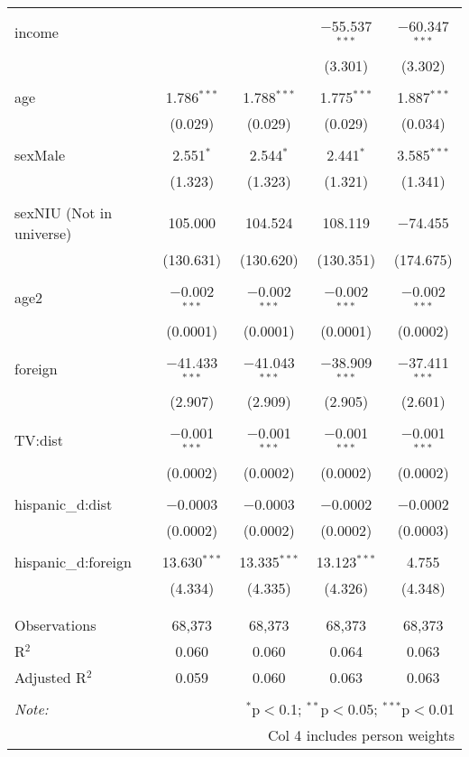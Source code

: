 \begin{table}[!htbp]
\begin{tabular}{@{\extracolsep{-5pt}}lcccc}
  & & & & \\ 
 income &  &  & $-$55.537$^{***}$ & $-$60.347$^{***}$ \\ 
  &  &  & (3.301) & (3.302) \\ 
  & & & & \\ 
 age & 1.786$^{***}$ & 1.788$^{***}$ & 1.775$^{***}$ & 1.887$^{***}$ \\ 
  & (0.029) & (0.029) & (0.029) & (0.034) \\ 
  & & & & \\ 
 sexMale & 2.551$^{*}$ & 2.544$^{*}$ & 2.441$^{*}$ & 3.585$^{***}$ \\ 
  & (1.323) & (1.323) & (1.321) & (1.341) \\ 
  & & & & \\ 
 sexNIU (Not in universe) & 105.000 & 104.524 & 108.119 & $-$74.455 \\ 
  & (130.631) & (130.620) & (130.351) & (174.675) \\ 
  & & & & \\ 
 age2 & $-$0.002$^{***}$ & $-$0.002$^{***}$ & $-$0.002$^{***}$ & $-$0.002$^{***}$ \\ 
  & (0.0001) & (0.0001) & (0.0001) & (0.0002) \\ 
  & & & & \\ 
 foreign & $-$41.433$^{***}$ & $-$41.043$^{***}$ & $-$38.909$^{***}$ & $-$37.411$^{***}$ \\ 
  & (2.907) & (2.909) & (2.905) & (2.601) \\ 
  & & & & \\ 
 TV:dist & $-$0.001$^{***}$ & $-$0.001$^{***}$ & $-$0.001$^{***}$ & $-$0.001$^{***}$ \\ 
  & (0.0002) & (0.0002) & (0.0002) & (0.0002) \\ 
  & & & & \\ 
 hispanic\_d:dist & $-$0.0003 & $-$0.0003 & $-$0.0002 & $-$0.0002 \\ 
  & (0.0002) & (0.0002) & (0.0002) & (0.0003) \\ 
  & & & & \\ 
 hispanic\_d:foreign & 13.630$^{***}$ & 13.335$^{***}$ & 13.123$^{***}$ & 4.755 \\ 
  & (4.334) & (4.335) & (4.326) & (4.348) \\ 
  & & & & \\ 
\hline \\[-1.8ex] 
Observations & 68,373 & 68,373 & 68,373 & 68,373 \\ 
R$^{2}$ & 0.060 & 0.060 & 0.064 & 0.063 \\ 
Adjusted R$^{2}$ & 0.059 & 0.060 & 0.063 & 0.063 \\ 
\hline 
\hline \\[-1.8ex] 
\textit{Note:}  & \multicolumn{4}{r}{$^{*}$p$<$0.1; $^{**}$p$<$0.05; $^{***}$p$<$0.01} \\ 
 & \multicolumn{4}{r}{Col 4 includes person weights} \\ 
\end{tabular} 
\end{table} 
